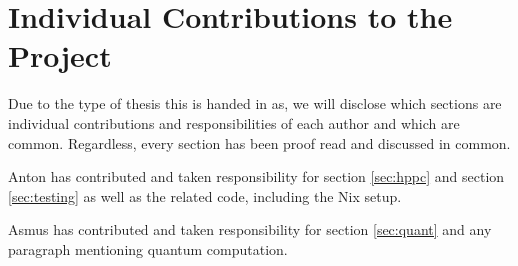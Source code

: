 \chapter*{Individual Contributions to the Project}
Due to the type of thesis this is handed in as, we will disclose which sections are individual contributions and responsibilities of each author and which are common. Regardless, every section has been proof read and discussed in common. 

Anton has contributed and taken responsibility for section \ref{sec:hppc} and section \ref{sec:testing} as well as the related code, including the Nix setup.

Asmus has contributed and taken responsibility for section \ref{sec:quant} and any paragraph mentioning quantum computation.

